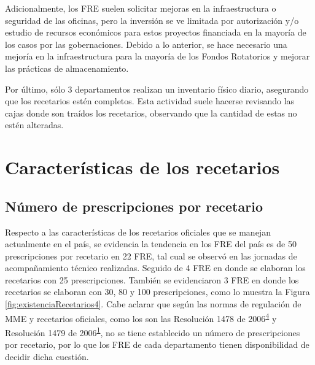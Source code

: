 \documentclass[
]{book}
\begin{document}
Adicionalmente, los FRE suelen solicitar mejoras en la infraestructura o seguridad de las oficinas, pero la inversión se ve limitada por autorización y/o estudio de recursos económicos para estos proyectos financiada en la mayoría de los casos por las gobernaciones. Debido a lo anterior, se hace necesario una mejoría en la infraestructura para la mayoría de los Fondos Rotatorios y mejorar las prácticas de almacenamiento.

Por último, sólo 3 departamentos realizan un inventario físico diario, asegurando que los recetarios estén completos. Esta actividad suele hacerse revisando las cajas donde son traídos los recetarios, observando que la cantidad de estas no estén alteradas.

\hypertarget{caracteruxedsticas-de-los-recetarios}{%
\section{Características de los recetarios}\label{caracteruxedsticas-de-los-recetarios}}


\hypertarget{nuxfamero-de-prescripciones-por-recetario}{%
\subsection{Número de prescripciones por recetario}\label{nuxfamero-de-prescripciones-por-recetario}}

Respecto a las características de los recetarios oficiales que se manejan actualmente en el país, se evidencia la tendencia en los FRE del país es de 50 prescripciones por recetario en 22 FRE, tal cual se observó en las jornadas de acompañamiento técnico realizadas. Seguido de 4 FRE en donde se elaboran los recetarios con 25 prescripciones. También se evidenciaron 3 FRE en donde los recetarios se elaboran con 30, 80 y 100 prescripciones, como lo muestra la Figura \ref{fig:existenciaRecetarios4}. Cabe aclarar que según las normas de regulación de MME y recetarios oficiales, como los son las Resolución 1478 de 2006\textsuperscript{\protect\hyperlink{ref-MSPS1478-2006}{4}} y Resolución 1479 de 2006\textsuperscript{\protect\hyperlink{ref-MSPS1479-2006}{1}}, no se tiene establecido un número de prescripciones por recetario, por lo que los FRE de cada departamento tienen disponibilidad de decidir dicha cuestión.
\end{document}
